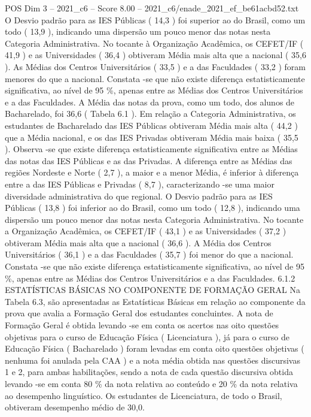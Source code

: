 \begin{textsample}{POS Dim 3 – 2021\_c6 – Score 8.00 – 2021\_c6/enade\_2021\_ef\_be61acbd52.txt}
O Desvio padrão para as IES Públicas ( 14,3 ) foi superior ao do Brasil, como um todo ( 13,9 ), indicando uma dispersão um pouco menor das notas nesta Categoria Administrativa.
No tocante à Organização Acadêmica, os CEFET/IF ( 41,9 ) e as Universidades ( 36,4 ) obtiveram Média mais alta que a nacional ( 35,6 ).
As Médias dos Centros Universitários ( 33,5 ) e a das Faculdades ( 33,2 ) foram menores do que a nacional.
Constata -se que não existe diferença estatisticamente significativa, ao nível de 95 \%, apenas entre as Médias dos Centros Universitários e a das Faculdades.
A Média das notas da prova, como um todo, dos alunos de Bacharelado, foi 36,6 ( Tabela 6.1 ).
Em relação a Categoria Administrativa, os estudantes de Bacharelado das IES Públicas obtiveram Média mais alta ( 44,2 ) que a Média nacional, e os das IES Privadas obtiveram Média mais baixa ( 35,5 ).
Observa -se que existe diferença estatisticamente significativa entre as Médias das notas das IES Públicas e as das Privadas.
A diferença entre as Médias das regiões Nordeste e Norte ( 2,7 ), a maior e a menor Média, é inferior à diferença entre a das IES Públicas e Privadas ( 8,7 ), caracterizando -se uma maior diversidade administrativa do que regional.
O Desvio padrão para as IES Públicas ( 13,8 ) foi inferior ao do Brasil, como um todo ( 12,8 ), indicando uma dispersão um pouco menor das notas nesta Categoria Administrativa.
No tocante a Organização Acadêmica, os CEFET/IF ( 43,1 ) e as Universidades ( 37,2 ) obtiveram Média mais alta que a nacional ( 36,6 ).
A Média dos Centros Universitários ( 36,1 ) e a das Faculdades ( 35,7 ) foi menor do que a nacional.
Constata -se que não existe diferença estatisticamente significativa, ao nível de 95 \%, apenas entre as Médias dos Centros Universitários e a das Faculdades. 6.1.2 ESTATÍSTICAS BÁSICAS NO COMPONENTE DE FORMAÇÃO GERAL Na Tabela 6.3, são apresentadas as Estatísticas Básicas em relação ao componente da prova que avalia a Formação Geral dos estudantes concluintes.
A nota de Formação Geral é obtida levando -se em conta os acertos nas oito questões objetivas para o curso de Educação Física ( Licenciatura ), já para o curso de Educação Física ( Bacharelado ) foram levadas em conta oito questões objetivas ( nenhuma foi anulada pela CAA ) e a nota média obtida nas questões discursivas 1 e 2, para ambas habilitações, sendo a nota de cada questão discursiva obtida levando -se em conta 80 \% da nota relativa ao conteúdo e 20 \% da nota relativa ao desempenho linguístico.
Os estudantes de Licenciatura, de todo o Brasil, obtiveram desempenho médio de 30,0.

\end{textsample}
